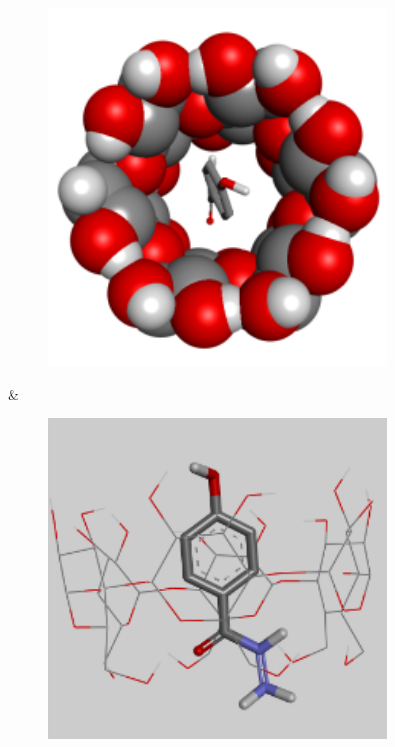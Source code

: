 \begin{figure}[H]
	\centering
	\includegraphics[width=0.8\textwidth]{media/chem2/image39}
	\caption*{}
\end{figure}
 &
\begin{figure}[H]
	\centering
	\includegraphics[width=0.8\textwidth]{media/chem2/image40}
	\caption*{}
\end{figure}
